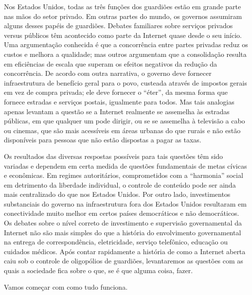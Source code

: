 Nos Estados Unidos, todas as três funções dos guardiões estão em grande parte nas mãos do
setor privado. Em outras partes do mundo, os governos assumiram alguns desses papéis de
guardiões. Debates familiares sobre serviços privados versus públicos têm acontecido como
parte da Internet quase desde o seu início. Uma argumentação conhecida é que a concorrência
entre partes privadas reduz os custos e melhora a qualidade; mas outros argumentam que a
consolidação resulta em eficiências de escala que superam os efeitos negativos da redução da
concorrência. De acordo com outra narrativa, o governo deve fornecer infraestrutura de
benefício geral para o povo, custeada através de impostos gerais em vez de compra privada; ele
deve fornecer o ``éter'', da mesma forma que fornece estradas e serviços postais, igualmente
para todos. Mas tais analogias apenas levantam a questão se a Internet realmente se assemelha
às estradas públicas, em que qualquer um pode dirigir, ou se se assemelha à televisão a cabo
ou cinemas, que são mais acessíveis em áreas urbanas do que rurais e não estão disponíveis
para pessoas que não estão dispostas a pagar as taxas.

Os resultados das diversas respostas possíveis para tais questões têm sido variadas e dependem
em certa medida de questões fundamentais de metas cívicas e econômicas. Em regimes autoritários,
comprometidos com a ``harmonia'' social em detrimento da liberdade individual, o controle de
conteúdo pode ser ainda mais centralizado do que nos Estados Unidos. Por outro lado,
investimentos substanciais do governo na infraestrutura fora dos Estados Unidos resultaram em
conectividade muito melhor em certos países democráticos e não democráticos. Os debates sobre
o nível correto de investimento e supervisão governamental da Internet não são mais simples do
que a história do envolvimento governamental na entrega de correspondência, eletricidade, serviço
telefônico, educação ou cuidados médicos. Após contar rapidamente a história de como a Internet
aberta caiu sob o controle de oligopólios de guardiões, levantaremos as questões com as quais a
sociedade fica sobre o que, se é que alguma coisa, fazer.

Vamos começar com como tudo funciona.